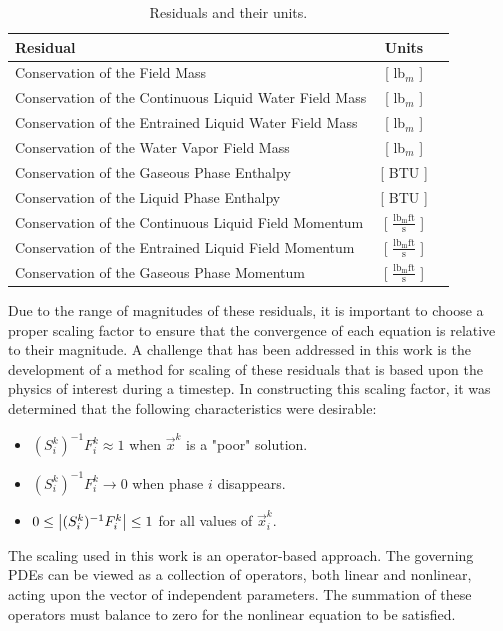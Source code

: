 \begin{table}[ht]
\centering
\begin{tabular}{@{}l c r @{}} \toprule
Residual & Units \\
\midrule
Conservation of the \NCG{} Field Mass                  & [ lb$_m$ ] \\
Conservation of the Continuous Liquid Water Field Mass & [ lb$_m$ ] \\
Conservation of the Entrained Liquid Water Field Mass  & [ lb$_m$ ] \\
Conservation of the Water Vapor Field Mass             & [ lb$_m$ ] \\
Conservation of the Gaseous Phase Enthalpy             & [ BTU ]    \\
Conservation of the Liquid Phase Enthalpy              & [ BTU ]    \\
Conservation of the Continuous Liquid Field Momentum   & [ $\frac{\text{lb}_{\text{m}} \text{ft}}{\text{s}}$ ] \\
Conservation of the Entrained Liquid Field Momentum & [ $\frac{\text{lb}_{\text{m}} \text{ft}}{\text{s}}$ ] \\
Conservation of the Gaseous Phase Momentum & [ $\frac{\text{lb}_{\text{m}} \text{ft}}{\text{s}}$ ] \\
\bottomrule  
\end{tabular}
\caption{Residuals and their units.}
\label{tab:scaling_units_scales}
\end{table}

Due to the range of magnitudes of these residuals, it is important to choose a proper scaling factor to ensure that the convergence of each equation is relative to their magnitude.
A challenge that has been addressed in this work is the development of a method for scaling of these residuals that is based upon the physics of interest during a timestep.
In constructing this scaling factor, it was determined that the following characteristics were desirable:

\begin{itemize}
\item{$(S_{i}^{k})^{-1} F^{k}_i \approx 1$ when $\vec{x}^{k}$ is a "poor" solution.}
\item{$(S_{i}^{k})^{-1} F^{k}_i \rightarrow 0$ when phase $i$ disappears.}
\item{$0 \leq \left|(S_{i}^{k})^{-1} F^{k}_{i}\right| \leq 1 $ for all values of $\vec{x}^{k}_i$.}
\end{itemize}

The scaling used in this work is an operator-based approach.
The governing PDEs can be viewed as a collection of operators, both linear and nonlinear, acting upon the vector of independent parameters.
The summation of these operators must balance to zero for the nonlinear equation to be satisfied.

